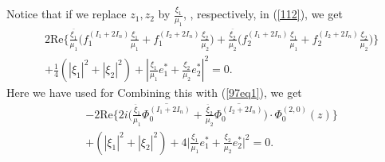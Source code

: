 \documentclass[12pt]{article}
\numberwithin{equation}{section}
\def\ov{\overline}
\begin{document}
Notice that if we replace $z_1,z_2$ by $\frac{\xi_1}{\mu_1}$,
, respectively, in (\ref{112}), we get
\begin{equation}\begin{split}
&2\text{Re}\Big\{\frac{\ov{\xi_1}}{\mu_1}
   \Big(f_{1}^{(I_1+2I_n)}\frac{\xi_1}{\mu_1}+f_{1}^{(I_2+2I_n)}\frac{\xi_2}{\mu_2}\Big)
   +\frac{\ov{\xi_2}}{\mu_2}
   \Big(f_{2}^{(I_1+2I_n)}\frac{\xi_1}{\mu_1}+f_{2}^{(I_2+2I_n)}\frac{\xi_2}{\mu_2}\Big)\Big\}\\
&+\frac{1}{4}(|\xi_1|^2+|\xi_2|^2)+|\frac{\xi_1}{\mu_1}e^*_1+\frac{\xi_2}{\mu_2}e^*_2|^2=0.
\end{split}\end{equation}
Here we have used  for
 Combining this with (\ref{97eq1}), we get
\begin{equation}\begin{split}\label{97eq7}
&-2\text{Re}\Big\{2i\Big(\frac{\ov\xi_1}{\mu_1}\ov{\Phi_0^{(I_1+2I_n)}}
+\frac{\ov\xi_2}{\mu_2}\ov{\Phi_0^{(I_2+2I_n)}}\Big)\cdot\Phi_0^{(2,0)}(z)\Big\}\\
&+(|\xi_1|^2+|\xi_2|^2)+4\big|\frac{\xi_1}{\mu_1}e^*_1+\frac{\xi_2}{\mu_2}e^*_2\big|^2=0.
\end{split}\end{equation}

\medskip

\end{document}
